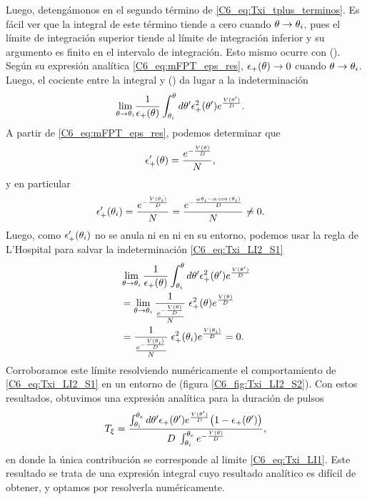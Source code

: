 \documentclass[./main.tex]{subfiles}
\begin{document}
Luego, detengámonos en el segundo término de \ref{C6_eq:Txi_tplus_terminos}. Es fácil ver que la integral de este término tiende a cero cuando $\theta \rightarrow \theta_i $, pues el límite de integración superior tiende al límite de integración inferior y su argumento es finito en el intervalo de integración. Esto mismo ocurre con \epsplus(\xx). Según su expresión analítica \ref{C6_eq:mFPT_eps_res}, $\epsilon_{+}(\theta) \rightarrow 0$ cuando $\theta \rightarrow \theta_i $. Luego, el cociente entre la integral y \epsplus(\xx) da lugar a la indeterminación 
\begin{align}
      \lim_{\theta \rightarrow   \theta_i }& \frac{1}{\epsilon_{+}(\theta)}  \int_{\theta_i}^{\theta} d\theta'  \epsilon_{+}^2(\theta') e^{ \frac{V(\theta')}{D}}.
     \label{C6_eq:Txi_LI2_S1}
\end{align}
A partir de \ref{C6_eq:mFPT_eps_res}, podemos determinar que 
\begin{align}
     \epsilon_{+}'(\theta) & = \frac{e^{- \frac{V(\theta)}{D}}}{N},
\end{align}
y en particular 
\begin{align}
     \epsilon_{+}'(\theta_i) & = \frac{e^{- \frac{V(\theta_i)}{D}}}{N} = \frac{e^{- \frac{\omega \theta_i - \alpha \cos{(\ensuremath{\theta_i})}}{D}}}{N} \neq 0. \nonumber 
\end{align}
Luego, como $\epsilon_{+}'(\theta_i)$ no se anula ni en \xxi ni en su entorno, podemos usar la regla de L'Hospital para salvar la indeterminación \ref{C6_eq:Txi_LI2_S1}
\begin{align}
     & \lim_{\theta \rightarrow   \theta_i } \frac{1}{\epsilon_{+}(\theta)}  \int_{\theta_i}^{\theta} d\theta'  \epsilon_{+}^2(\theta') e^{ \frac{V(\theta')}{D}} \nonumber \\
     & = \lim_{\theta \rightarrow   \theta_i } \frac{1}{\frac{e^{- \frac{V(\theta)}{D}}}{N}}  \; \epsilon_{+}^2(\theta) e^{ \frac{V(\theta)}{D}} \nonumber \\
     & = \frac{1}{\frac{e^{- \frac{V(\theta_i)}{D}}}{N}}  \; \epsilon_{+}^2(\theta_i) e^{ \frac{V(\theta_i)}{D}} = 0. 
     \label{C6_eq:Txi_LI2_S2}
\end{align}
Corroboramos este límite resolviendo numéricamente el comportamiento de \ref{C6_eq:Txi_LI2_S1} en un entorno de \xxi (figura \ref{C6_fig:Txi_LI2_S2}). Con estos resultados, obtuvimos una expresión analítica para la duración de pulsos
\begin{align}
     T_\xi = \frac{\int_{\theta_i}^{\theta_e} d \theta' \epsilon_{+}(\theta') e^{ \frac{V(\theta')}{D}} \big(1 - \epsilon_{+}(\theta') \big)}{D\; \int_{\theta_i}^{\theta_e} e^{- \frac{V(\theta)}{D}}},
     \label{C6_eq:Txi}
\end{align}
en donde la única contribución se corresponde al limite \ref{C6_eq:Txi_LI1}. Este resultado se trata de una expresión integral cuyo resultado analítico es difícil de obtener, y optamos por resolverla numéricamente.
\end{document}
